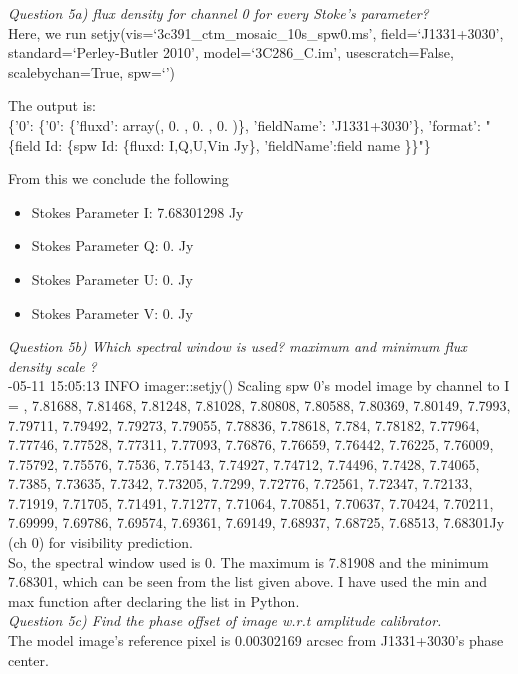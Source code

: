 \documentclass[12pt, a4paper]{article}
\begin{document}
\noindent \textit{Question 5a) flux density for channel 0 for every Stoke’s parameter?} \\
Here, we run setjy(vis=`3c391\_ctm\_mosaic\_10s\_spw0.ms', field=`J1331+3030', standard=`Perley-Butler 2010', model=`3C286\_C.im', usescratch=False, scalebychan=True, spw=`')

\noindent The output is: \\
{ \tiny \noindent
\{'0': \{'0': \{'fluxd': array(,  0.        ,  0.        ,  0.        \rbrack)\},
       'fieldName': 'J1331+3030'\},
'format': "\{field Id: \{spw Id: \{fluxd: \lbrack I,Q,U,V\rbrack in Jy\}, 'fieldName':field name \}\}"\} 
}

\noindent From this we conclude the following
\begin{itemize}
    \item Stokes Parameter I: 7.68301298 Jy
    \item Stokes Parameter Q: 0. Jy
    \item Stokes Parameter U: 0. Jy
    \item Stokes Parameter V: 0. Jy
\end{itemize}

\noindent \textit{Question 5b) Which spectral window is used? maximum and minimum flux density scale ?} \\
{\tiny {}-05-11 15:05:13     INFO    imager::setjy() Scaling spw 0's model image by channel to I = , 7.81688, 7.81468, 7.81248, 7.81028, 7.80808, 7.80588, 7.80369, 7.80149, 7.7993, 7.79711, 7.79492, 7.79273, 7.79055, 7.78836, 7.78618, 7.784, 7.78182, 7.77964, 7.77746, 7.77528, 7.77311, 7.77093, 7.76876, 7.76659, 7.76442, 7.76225, 7.76009, 7.75792, 7.75576, 7.7536, 7.75143, 7.74927, 7.74712, 7.74496, 7.7428, 7.74065, 7.7385, 7.73635, 7.7342, 7.73205, 7.7299, 7.72776, 7.72561, 7.72347, 7.72133, 7.71919, 7.71705, 7.71491, 7.71277, 7.71064, 7.70851, 7.70637, 7.70424, 7.70211, 7.69999, 7.69786, 7.69574, 7.69361, 7.69149, 7.68937, 7.68725, 7.68513, 7.68301\rbrack Jy (ch 0) for visibility prediction. } \\

So, the spectral window used is 0. The maximum is 7.81908 and the minimum 7.68301, which can be seen from the list given above. I have used the min and max function after declaring the list in Python.\\

\noindent \textit{Question 5c) Find the phase offset of image w.r.t amplitude calibrator.} \\
The model image's reference pixel is 0.00302169 arcsec from J1331+3030's phase center. \\
\end{document}
